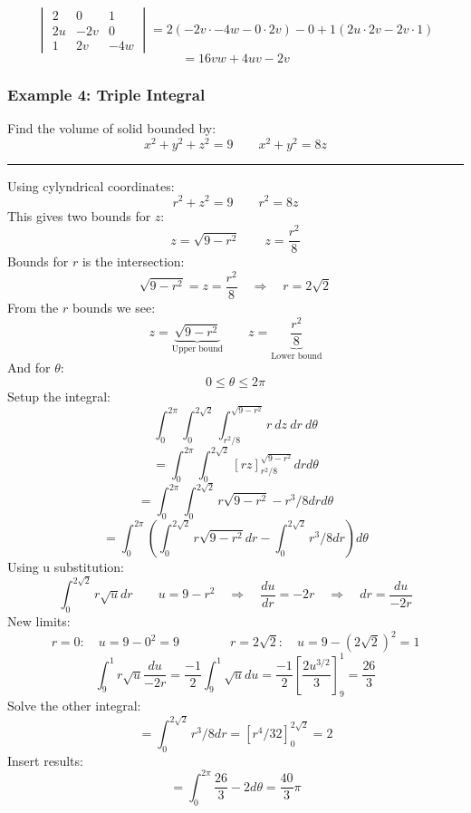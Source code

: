 $$\begin{vmatrix}
  2&0&1\\
  2u&-2v&0\\
  1&2v&-4w
\end{vmatrix}=2(-2v\cdot-4w-0\cdot2v)-0+1(2u\cdot2v-2v\cdot1)$$
$$=16vw+4uv-2v$$

\subsubsection{Example 4: Triple Integral}
Find the volume of solid bounded by:
$$x^2+y^2+z^2=9\qquad x^2+y^2=8z$$

\rule{\textwidth}{0.5pt}

Using cylyndrical coordinates:
$$r^2+z^2=9\qquad r^2=8z$$
This gives two bounds for $z$:
$$z=\sqrt{9-r^2}\qquad z=\frac{r^2}{8}$$
Bounds for $r$ is the intersection:
$$\sqrt{9-r^2}= z=\frac{r^2}{8}\quad\Rightarrow\quad r=2\sqrt{2}$$
From the $r$ bounds we see:
$$z=\underbrace{\sqrt{9-r^2}}_\text{Upper bound}\qquad z=\underbrace{\frac{r^2}{8}}_\text{Lower bound}$$
And for $\theta$:
$$0\leq\theta\leq 2\pi$$
Setup the integral:
$$\int_{0}^{2\pi}\int_{0}^{2\sqrt{2}}\int_{r^2/8}^{\sqrt{9-r^2}}r\ dz\ dr\ d\theta$$
$$=\int_{0}^{2\pi}\int_{0}^{2\sqrt{2}}\left[rz \right]_{r^2/8}^{\sqrt{9-r^2}} dr d\theta$$
$$=\int_{0}^{2\pi}\int_{0}^{2\sqrt{2}}r\sqrt{9-r^2}- r^3/8 dr d\theta$$
$$=\int_{0}^{2\pi}\left(\int_{0}^{2\sqrt{2}}r\sqrt{9-r^2}dr-\int_{0}^{2\sqrt{2}}r^3/8 dr \right)d\theta$$
Using u substitution:
$$\int_{0}^{2\sqrt{2}}r\sqrt{u}dr\qquad u=9-r^2\quad\Rightarrow\quad \frac{du}{dr}=-2r\quad\Rightarrow\quad dr=\frac{du}{-2r}$$
New limits:
$$r=0:\quad u=9-0^2=9\qquad\qquad r=2\sqrt{2}:\quad u=9-(2\sqrt{2})^2=1$$
$$\int_{9}^{1}r\sqrt{u}\frac{du}{-2r}=\frac{-1}{2}\int_{9}^{1}\sqrt{u}du=\frac{-1}{2}\left[\frac{2 u^{3/2}}{3}\right]_{9}^{1}=\frac{26}{3}$$
Solve the other integral:
$$=\int_{0}^{2\sqrt{2}}r^3/8 dr=\left[r^4/32 \right]_{0}^{2\sqrt{2}}=2$$
Insert results:
$$=\int_{0}^{2\pi}\frac{26}{3}-2d\theta=\boxed{\frac{40}{3}\pi}$$
